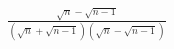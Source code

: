 \documentclass[preview]{standalone}
\begin{document}
\begin{align*}
\frac{\sqrt{n}-\sqrt{n-1}}{(\sqrt{n}+\sqrt{n-1})(\sqrt{n}-\sqrt{n-1})}
\end{align*}
\end{document}
